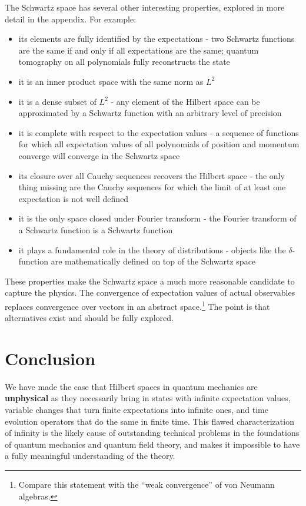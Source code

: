 \documentclass[10pt,twocolumn, nofootinbib]{revtex4-2}
\begin{document}
The Schwartz space has several other interesting properties,\cite{moretti_spectral_2017, reed_methods_1980} explored in more detail in the appendix. For example:

\begin{itemize}
\item its elements are fully identified by the expectations - two Schwartz functions are the same if and only if all expectations are the same; quantum tomography on all polynomials fully reconstructs the state
\item it is an inner product space with the same norm as $L^2$
\item it is a dense subset of $L^2$ - any element of the Hilbert space can be approximated by a Schwartz function with an arbitrary level of precision
\item it is complete with respect to the expectation values - a sequence of functions for which all expectation values of all polynomials of position and momentum converge will converge in the Schwartz space
\item its closure over all Cauchy sequences recovers the Hilbert space - the only thing missing are the Cauchy sequences for which the limit of at least one expectation is not well defined
\item it is the only space closed under Fourier transform - the Fourier transform of a Schwartz function is a Schwartz function
\item it plays a fundamental role in the theory of distributions - objects like the $\delta$-function are mathematically defined on top of the Schwartz space
\end{itemize}
These properties make the Schwartz space a much more reasonable candidate to capture the physics. The convergence of expectation values of actual observables replaces convergence over vectors in an abstract space.\footnote{Compare this statement with the ``weak convergence'' of von Neumann algebras.} The point is that alternatives exist and should be fully explored.

\section{Conclusion}

We have made the case that Hilbert spaces in quantum mechanics are \textbf{unphysical} as they necessarily bring in states with infinite expectation values, variable changes that turn finite expectations into infinite ones, and time evolution operators that do the same in finite time. This flawed characterization of infinity is the likely cause of outstanding technical problems in the foundations of quantum mechanics and quantum field theory, and makes it impossible to have a fully meaningful understanding of the theory.
\end{document}
